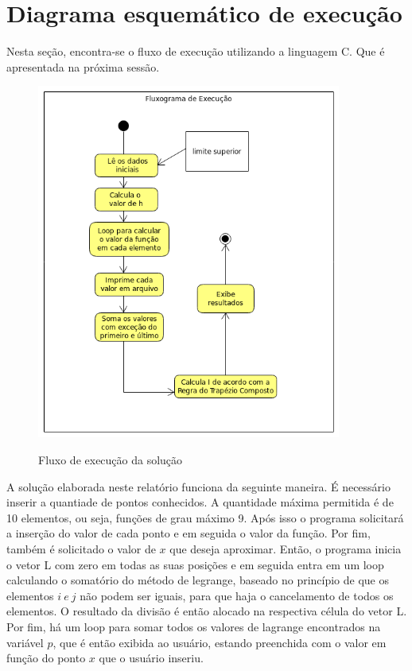 \documentclass[12pt, hidelinks]{article}
\begin{document}

\newpage
\section{Diagrama esquemático de execução}

Nesta seção, encontra-se o fluxo de execução utilizando a linguagem C. Que é apresentada na próxima sessão.
\begin{figure}[!h]
  \centering
  \includegraphics[width=10cm]{figuras/fluxograma.png}\\
  \caption{Fluxo de execução da solução}\label{fig:fluxo}
\end{figure}

A solução elaborada neste relatório funciona da seguinte maneira. É necessário inserir a quantiade de pontos
conhecidos. A quantidade máxima permitida é de 10 elementos, ou seja, funções de grau máximo 9.
Após isso o programa solicitará a inserção do valor de cada ponto e em seguida o valor da função. Por fim,
também é solicitado o valor de $x$ que deseja aproximar.
Então, o programa inicia o vetor L com zero em todas as suas posições e em seguida entra em um loop calculando
o somatório do método de legrange, baseado no princípio de que os elementos $i~e~j$ não podem ser iguais, para que
haja o cancelamento de todos os elementos. O resultado da divisão é então alocado na respectiva célula do vetor L.
Por fim, há um loop para somar todos os valores de lagrange encontrados na variável $p$, que é então exibida ao
usuário, estando preenchida com o valor em função do ponto $x$ que o usuário inseriu.
\end{document}

